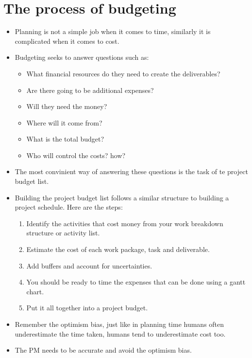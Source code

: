 \section{The process of budgeting}
\begin{itemize}
    \item Planning is not a simple job when it comes to time, similarly it is complicated when it comes to cost.
    \item Budgeting seeks to answer questions such as:
        \begin{itemize}
            \item What financial resources do they need to create the deliverables?
            \item Are there going to be additional expenses?
            \item Will they need the money?
            \item Where will it come from?
            \item What is the total budget?
            \item Who will control the costs? how?
        \end{itemize}
    
    \item The most convinient way of answering these questions is the task of te project budget list.
    \item Building the project budget list follows a similar structure to building a project schedule. Here are the steps:
        \begin{enumerate}
            \item Identify the activities that cost money from your work breakdown structure or activity list.
            \item Estimate the cost of each work package, task and deliverable.
            \item Add buffers and account for uncertainties.
            \item You should be ready to time the expenses that can be done using a gantt chart.
            \item Put it all together into a project budget.
        \end{enumerate}
    
    \item Remember the optimism bias, just like in planning time humans often underestimate the time taken, humans tend to underestimate cost too.
    \item The PM needs to be accurate and avoid the optimism bias.
\end{itemize}

